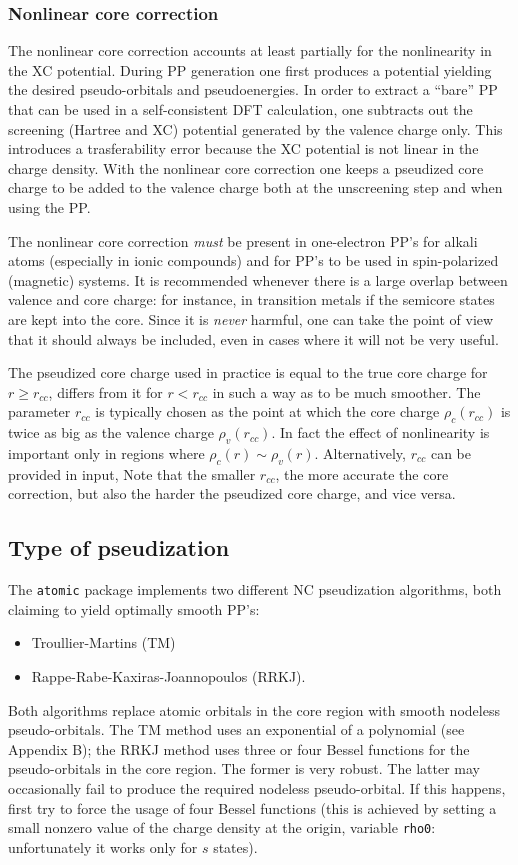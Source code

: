 \documentclass[12pt]{article}
\begin{document}
\subsubsection{Nonlinear core correction}
\label{nlcc}
The nonlinear core correction\cite{CoreCorr} 
accounts at least partially for the nonlinearity
in the XC potential. During PP generation one first
produces a potential yielding the desired pseudo-orbitals and
pseudoenergies. In order to extract a ``bare'' PP that can be used
in a self-consistent DFT calculation, one subtracts out the screening 
(Hartree and XC) potential generated by the valence 
charge only. This introduces a trasferability error because the XC 
potential is not
linear in the charge density. With the nonlinear core correction one 
keeps a pseudized core charge to be added to the valence charge both 
at the unscreening step and when using the PP.

The nonlinear core correction {\em must} be present in one-electron PP's for
alkali atoms (especially in ionic compounds) and for PP's to be used in 
spin-polarized (magnetic) systems. It is recommended whenever there is a 
large overlap between valence and core charge: for instance, in transition 
metals if the semicore states are kept into the core. Since it is {\em never}
harmful, one can take the point of view that it should always be included,
even in cases where it will not be very useful.

The pseudized core charge used in practice is equal to the true
core charge for $r\ge r_{cc}$, differs from it  for $r < r_{cc}$
in such a way as to be much smoother. The parameter $r_{cc}$ is
typically chosen as the point at which the core charge $\rho_c(r_{cc})$ 
is twice as big as the valence charge $\rho_v(r_{cc})$. In fact the 
effect of nonlinearity is important only in regions where 
$\rho_c(r)\sim\rho_v(r)$. Alternatively, $r_{cc}$ can be provided 
in input, Note that the smaller $r_{cc}$, the more accurate the core 
correction, but also the harder the pseudized core charge, and vice versa.

\subsection{Type of pseudization}
\label{pseudization}
The \texttt{atomic} package implements two different NC pseudization 
algorithms, both claiming to yield optimally smooth PP's:
\begin{itemize}
\item Troullier-Martins \cite{TM} (TM) 
\item Rappe-Rabe-Kaxiras-Joannopoulos \cite{RRKJ} (RRKJ).
\end{itemize}
Both algorithms replace atomic orbitals in the core region 
with smooth nodeless pseudo-orbitals. The TM method uses an
exponential of a polynomial (see Appendix B); the RRKJ method 
uses three or four Bessel functions for the pseudo-orbitals in
the core region. The former is very robust. The latter may 
occasionally fail to produce the required nodeless pseudo-orbital.
If this happens, first try to force the usage of four Bessel functions
(this is achieved by setting a  small nonzero value of 
the charge density at the origin, variable \texttt{rho0}:
unfortunately it works only for $s$ states).
\end{document}
